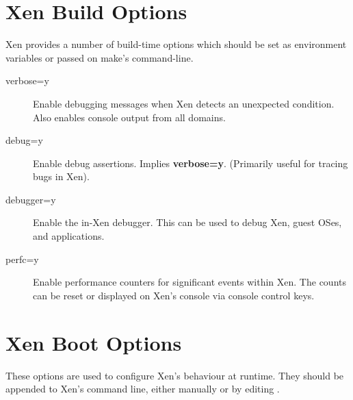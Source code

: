 \documentclass[11pt,twoside,final,openright]{report}
\begin{document}
\section{Xen Build Options}

Xen provides a number of build-time options which should be set as
environment variables or passed on make's command-line.

\begin{description}
\item[verbose=y] Enable debugging messages when Xen detects an
  unexpected condition.  Also enables console output from all domains.
\item[debug=y] Enable debug assertions.  Implies {\bf verbose=y}.
  (Primarily useful for tracing bugs in Xen).
\item[debugger=y] Enable the in-Xen debugger. This can be used to
  debug Xen, guest OSes, and applications.
\item[perfc=y] Enable performance counters for significant events
  within Xen. The counts can be reset or displayed on Xen's console
  via console control keys.
\end{description}


\section{Xen Boot Options}
\label{s:xboot}

These options are used to configure Xen's behaviour at runtime.  They
should be appended to Xen's command line, either manually or by
editing .
\end{document}
